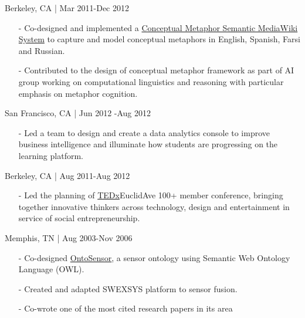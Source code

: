 \documentclass[11pt,article,oneside]{memoir}
\begin{document}
 \hfill Berkeley, CA | Mar 2011-Dec 2012
\begin{itemize}[noitemsep,nolistsep]
\item[-] Co-designed and implemented a \href{http://metaphor.icsi.berkeley.edu}{Conceptual Metaphor Semantic MediaWiki System} to capture and model conceptual metaphors in English, Spanish, Farsi and Russian. 
\item[-] Contributed to the design of conceptual metaphor framework as part of AI group working on computational linguistics and reasoning with particular emphasis on metaphor cognition.
\end{itemize} 

 \hfill San Francisco, CA | Jun 2012 -Aug 2012
\begin{itemize}[noitemsep,nolistsep]
\item[-]Led a team to design and create a data analytics console to improve business intelligence and illuminate how students are progressing on the learning platform.
\end{itemize} 

 \hfill Berkeley, CA | Aug 2011-Aug 2012
\begin{itemize}[noitemsep,nolistsep]
\item[-]Led the planning of \href{http://www.ted.com/tedx/events/3790}{TEDx}EuclidAve 100+ member conference, bringing together innovative thinkers across technology, design and entertainment in service of social entrepreneurship.
\end{itemize} 

 \hfill Memphis, TN | Aug 2003-Nov 2006
\begin{itemize}[noitemsep,nolistsep]
\item[-]Co-designed \href{https://scholar.google.com/scholar?hl=en&q=Building+a+Sensor+Ontology\%3A+A+Practical+Approach+Leveraging+ISO+and+OGC+Models.&btnG=&as_sdt=1\%2C43&as_sdtp=}{OntoSensor}, a sensor ontology using Semantic Web Ontology Language (OWL).
\item[-]Created and adapted SWEXSYS platform to sensor fusion.
\item[-]Co-wrote one of the most cited research papers in its area
\end{itemize} 
\end{document}
